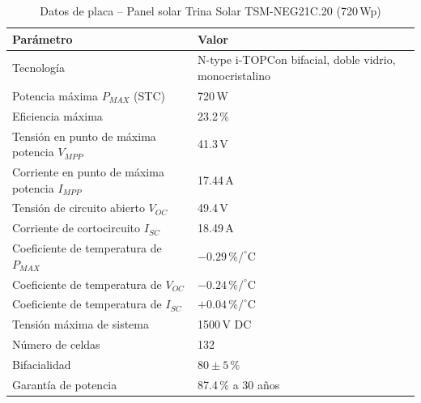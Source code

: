 \documentclass[11pt,a4paper]{article}
\begin{document}
\begin{table}[H]
\centering
\caption{Datos de placa -- Panel solar Trina Solar TSM-NEG21C.20 (720\,Wp)}
\begin{tabular}{ll}
\toprule
Par\'ametro & Valor \\
\midrule
Tecnolog\'ia & N-type i-TOPCon bifacial, doble vidrio, monocristalino \\
Potencia m\'axima $P_{MAX}$ (STC) & 720\,W \\
Eficiencia m\'axima & 23.2\,\% \\
Tensi\'on en punto de m\'axima potencia $V_{MPP}$ & 41.3\,V \\
Corriente en punto de m\'axima potencia $I_{MPP}$ & 17.44\,A \\
Tensi\'on de circuito abierto $V_{OC}$ & 49.4\,V \\
Corriente de cortocircuito $I_{SC}$ & 18.49\,A \\
Coeficiente de temperatura de $P_{MAX}$ & $-0.29\,\%/^{\circ}$C \\
Coeficiente de temperatura de $V_{OC}$ & $-0.24\,\%/^{\circ}$C \\
Coeficiente de temperatura de $I_{SC}$ & $+0.04\,\%/^{\circ}$C \\
Tensi\'on m\'axima de sistema & 1500\,V DC \\
N\'umero de celdas & 132 \\
Bifacialidad & $80\pm5\,\%$ \\
Garant\'ia de potencia & 87.4\,\% a 30 a\~nos \\
\bottomrule
\end{tabular}
\end{table}
\end{document}
